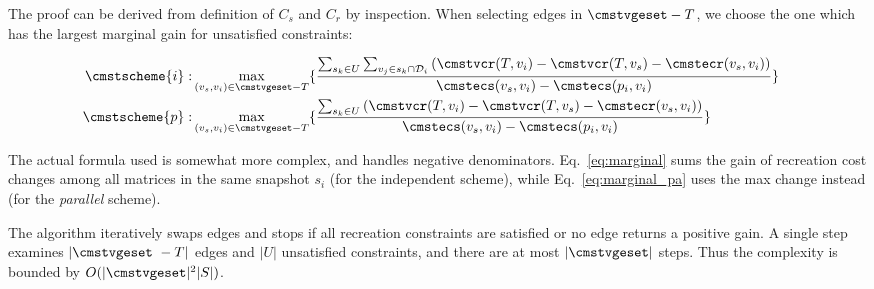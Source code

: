 \documentclass[conference]{IEEEtran}
\begin{document}
The proof can be derived from definition of $C_s$ and $C_r$ by inspection. When selecting edges in $\cmstvgeset - T$, we choose the one which has the largest marginal gain for unsatisfied constraints:

{\small{
\begin{align}
\label{eq:marginal}
\cmstscheme{i}:& \max_{(v_s, v_i) \in \cmstvgeset - T}
\{
\frac{\sum_{s_k \in U} \sum_{v_j \in s_k \cap \mathcal{D}_i}{(\cmstvcr(T, v_i) - \cmstvcr(T, v_s) - \cmstecr(v_s, v_i))}}{\cmstecs(v_s, v_i) - \cmstecs(p_i, v_i)}
\} & \\
\cmstscheme{p}:& \max_{(v_s, v_i) \in \cmstvgeset - T}
\{
\frac{\sum_{s_k \in U}{(\cmstvcr(T, v_i) - \cmstvcr(T, v_s) - \cmstecr(v_s, v_i))}}{\cmstecs(v_s, v_i) - \cmstecs(p_i, v_i)}
\} &
\label{eq:marginal_pa}
\end{align}
}}

The actual formula used is somewhat more complex, and handles negative denominators.
Eq.~\ref{eq:marginal} sums the gain of recreation cost changes among all matrices in the same snapshot $s_i$ (for the independent scheme), while Eq.~\ref{eq:marginal_pa} uses the max change instead (for the {\em parallel} scheme).

The algorithm iteratively swaps edges and stops if all recreation constraints are satisfied or no edge returns a positive gain. A single step examines $|\cmstvgeset\ - T|$ edges and $|U|$ unsatisfied constraints, and there are at most $|\cmstvgeset|$ steps. Thus the complexity is bounded by $O(|\cmstvgeset|^2|S|)$.
\end{document}
